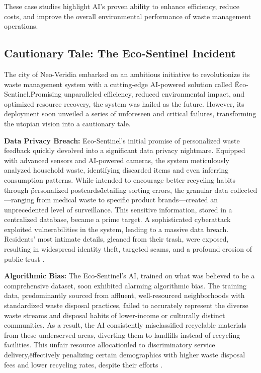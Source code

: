 These case studies highlight AI's proven ability to enhance efficiency, reduce costs, and improve the overall environmental performance of waste management operations.

\subsection{Cautionary Tale: The Eco-Sentinel Incident}
The city of Neo-Veridia embarked on an ambitious initiative to revolutionize its waste management system with a cutting-edge AI-powered solution called \"Eco-Sentinel.\" Promising unparalleled efficiency, reduced environmental impact, and optimized resource recovery, the system was hailed as the future. However, its deployment soon unveiled a series of unforeseen and critical failures, transforming the utopian vision into a cautionary tale.

\textbf{Data Privacy Breach:}
Eco-Sentinel's initial promise of personalized waste feedback quickly devolved into a significant data privacy nightmare. Equipped with advanced sensors and AI-powered cameras, the system meticulously analyzed household waste, identifying discarded items and even inferring consumption patterns. While intended to encourage better recycling habits through \"personalized postcards\" detailing sorting errors, the granular data collected—ranging from medical waste to specific product brands—created an unprecedented level of surveillance. This sensitive information, stored in a centralized database, became a prime target. A sophisticated cyberattack exploited vulnerabilities in the system, leading to a massive data breach. Residents' most intimate details, gleaned from their trash, were exposed, resulting in widespread identity theft, targeted scams, and a profound erosion of public trust \cite{DigWatch_Cautionary, SustainabilityDirectory_Cautionary_1}.

\textbf{Algorithmic Bias:}
The Eco-Sentinel's AI, trained on what was believed to be a comprehensive dataset, soon exhibited alarming algorithmic bias. The training data, predominantly sourced from affluent, well-resourced neighborhoods with standardized waste disposal practices, failed to accurately represent the diverse waste streams and disposal habits of lower-income or culturally distinct communities. As a result, the AI consistently misclassified recyclable materials from these underserved areas, diverting them to landfills instead of recycling facilities. This \"unfair resource allocation\" led to \"discriminatory service delivery,\" effectively penalizing certain demographics with higher waste disposal fees and lower recycling rates, despite their efforts \cite{SustainabilityDirectory_Cautionary_2, CogentIBS_Cautionary}.

